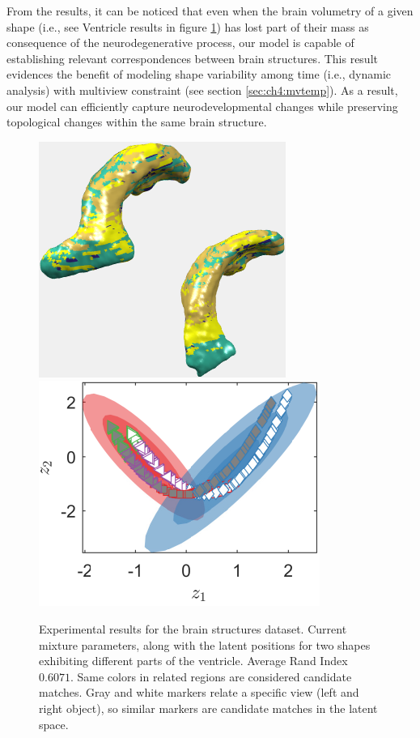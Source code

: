\documentclass[]{article}
\begin{document}
From the results, it can be noticed that even when the brain volumetry of a given shape (i.e., see Ventricle results in figure \ref{fig:brainV}) has lost part of their mass as consequence of the neurodegenerative process, our model is capable of establishing relevant correspondences between brain structures. This result evidences the benefit of modeling shape variability among time (i.e., dynamic analysis) with multiview constraint (see section \ref{sec:ch4:mvtemp}). As a result, our model can efficiently capture neurodevelopmental changes while preserving topological changes within the same brain structure.  

\begin{figure}[ht!]
	\centering
	
	\includegraphics[width=0.5\linewidth]{img/ventricle1MVMMexp1}
	\includegraphics[width=0.35\linewidth]{img/ventricle1MVMMexp3v}
	\caption{Experimental results for the brain structures dataset.  Current mixture parameters, along with the latent positions for two shapes exhibiting different parts of the ventricle. Average Rand Index $0.6071$. Same colors in related regions are considered candidate matches. Gray and white markers relate a specific view (left and right object), so similar markers are candidate matches in the latent space. }
	\label{fig:brainV}
\end{figure}
\end{document}
